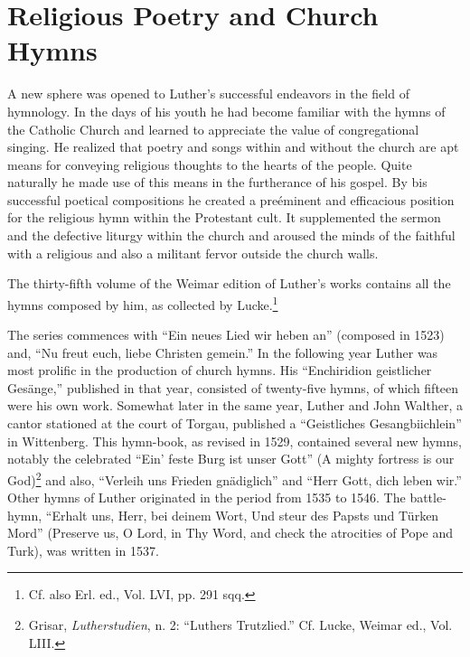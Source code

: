 \section{Religious Poetry and Church Hymns}

A new sphere was opened to Luther’s successful endeavors in the
field of hymnology. In the days of his youth he had become familiar
with the hymns of the Catholic Church and learned to appreciate the value
of congregational singing. He realized that poetry and
songs within and without the church are apt means for conveying
religious thoughts to the hearts of the people. Quite naturally he made
use of this means in the furtherance of his gospel. By bis successful
poetical compositions he created a preéminent and efficacious position
for the religious hymn within the Protestant cult. It supplemented
the sermon and the defective liturgy within the church and aroused
the minds of the faithful with a religious and also a militant fervor
outside the church walls.

The thirty-fifth volume of the Weimar edition of Luther’s works
contains all the hymns composed by him, as collected by Lucke.\footnote{Cf. also Erl. ed., Vol. LVI, pp. 291 sqq.}

The series commences with “Ein neues Lied wir heben an” (composed
in 1523) and, “Nu freut euch, liebe Christen gemein.” In the following
year Luther was most prolific in the production of church
hymns. His “Enchiridion geistlicher Gesänge,” published in that
year, consisted of twenty-five hymns, of which fifteen were his own
work. Somewhat later in the same year, Luther and John Walther,
a cantor stationed at the court of Torgau, published a “Geistliches
Gesangbiichlein” in Wittenberg. This hymn-book, as revised in 1529,
contained several new hymns, notably the celebrated “Ein’ feste Burg
ist unser Gott” (A mighty fortress is our God)\footnote{Grisar, \textit{Lutherstudien}, n. 2: “Luthers Trutzlied.” Cf. Lucke, Weimar ed., Vol. LIII.}
 and also, “Verleih
uns Frieden gnädiglich” and “Herr Gott, dich leben wir.” Other
hymns of Luther originated in the period from 1535 to 1546. The
battle-hymn, “Erhalt uns, Herr, bei deinem Wort, Und steur des
Papsts und Türken Mord” (Preserve us, O Lord, in Thy Word, and
check the atrocities of Pope and Turk), was written in 1537.

